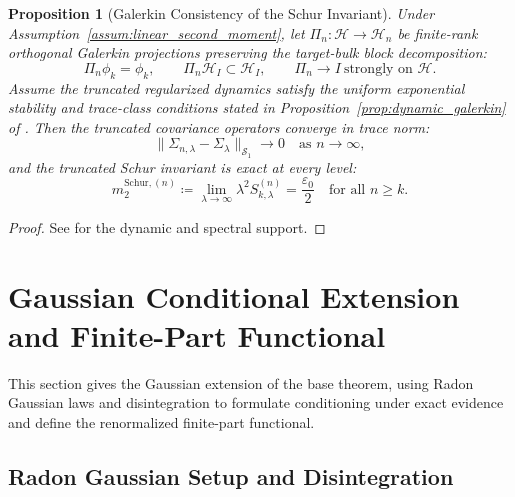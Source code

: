 \documentclass[11pt]{amsart}
\theoremstyle{plain}
\newtheorem{proposition}[theorem]{Proposition}
\theoremstyle{definition}
\theoremstyle{remark}
\begin{document}
\begin{proposition}[Galerkin Consistency of the Schur Invariant]
  \label{prop:galerkin_consistency}
  Under Assumption~\ref{assum:linear_second_moment}, let $\Pi_n:\mathcal{H}\to\mathcal{H}_n$ be finite-rank orthogonal Galerkin projections preserving the target-bulk block decomposition:
  \begin{equation}
    \Pi_n\phi_k=\phi_k,\qquad \Pi_n\mathcal{H}_I\subset\mathcal{H}_I,\qquad \Pi_n\to I\ \text{strongly on }\mathcal{H}.
  \end{equation}
  Assume the truncated regularized dynamics satisfy the uniform exponential stability and trace-class conditions stated in Proposition~\ref{prop:dynamic_galerkin} of .  Then the truncated covariance operators converge in trace norm:
  \begin{equation}
    \|\Sigma_{n,\lambda}-\Sigma_\lambda\|_{\mathcal{S}_1}\to0\quad\text{as }n\to\infty,
  \end{equation}
  and the truncated Schur invariant is exact at every level:
  \begin{equation}
    m_2^{\mathrm{Schur},(n)} \coloneqq \lim_{\lambda\to\infty} \lambda^2 S_{k,\lambda}^{(n)} = \frac{\varepsilon_0}{2} \quad \text{for all } n \ge k.
  \end{equation}
\end{proposition}
\begin{proof}
  See  for the dynamic and spectral support.
\end{proof}

\section{Gaussian Conditional Extension and Finite-Part Functional}
\label{sec:gaussian_zero}

This section gives the Gaussian extension of the base theorem, using Radon Gaussian laws and disintegration to formulate conditioning under exact evidence and define the renormalized finite-part functional.

\subsection{Radon Gaussian Setup and Disintegration}
\label{sec:gaussian:setup}
\end{document}
